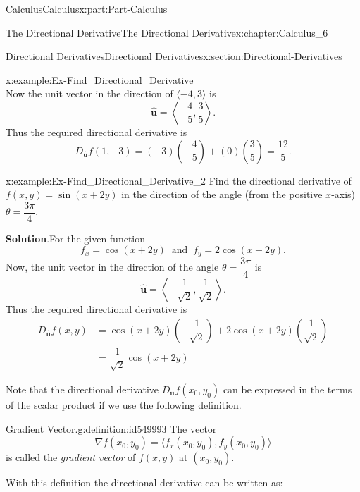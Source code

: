 \documentclass[oneside,10pt,]{book}
\newcommand{\blocktitlefont}{\relax}
\numberwithin{equation}{section}
\newcommand{\bm}[1]{\boldsymbol{#1}}
\newcommand{\amp}{&}
\begin{document}
\begin{partptx}{Calculus}{}{Calculus}{}{}{x:part:Part-Calculus}
\begin{chapterptx}{The Directional Derivative}{}{The Directional Derivative}{}{}{x:chapter:Calculus_6}
\begin{sectionptx}{Directional Derivatives}{}{Directional Derivatives}{}{}{x:section:Directional-Derivatives}
\begin{example}{}{x:example:Ex-Find_Directional_Derivative}
\begin{equation*}
\end{equation*}
Now the unit vector in the direction of \(\langle -4,3 \rangle\) is%
\begin{equation*}
\hat{\bm{u}} = \left \langle -\dfrac{4}{5}, \dfrac{3}{5} \right \rangle\text{.}
\end{equation*}
Thus the required directional derivative is%
\begin{equation*}
D_{\hat{\bm{u}}} f(1,-3) = (-3) \left( -\dfrac{4}{5} \right) + (0) \left( \dfrac{3}{5} \right) = \dfrac{12}{5}\text{.}
\end{equation*}
%
\end{example}
\begin{example}{}{x:example:Ex-Find_Directional_Derivative_2}%
Find the directional derivative of \(f(x,y) = \sin(x+2y)\) in the direction of the angle (from the positive \(x\)-axis) \(\theta = \dfrac{3 \pi}{4}\).%
\par\smallskip%
\noindent\textbf{\blocktitlefont Solution}.\hypertarget{g:solution:id549945}{}\quad{}For the given function%
\begin{equation*}
f_x = \cos(x+2y) \: \text{ and } \: f_y = 2\cos(x+2y)\text{.}
\end{equation*}
Now, the unit vector in the direction of the angle \(\theta = \dfrac{3 \pi}{4}\) is%
\begin{equation*}
\hat{\bm{u}} = \left \langle - \dfrac{1}{\sqrt{2}}, \dfrac{1}{\sqrt{2}} \right \rangle\text{.}
\end{equation*}
Thus the required directional derivative is%
\begin{align*}
D_{\hat{\bm{u}}} f(x,y) \amp = \cos(x+2y) \left( - \dfrac{1}{\sqrt{2}} \right) + 2\cos(x+2y) \left( \dfrac{1}{\sqrt{2}} \right)\\
\amp = \dfrac{1}{\sqrt{2}} \cos(x+2y)
\end{align*}
%
\end{example}
Note that the directional derivative \(D_{\bm{u}} f(x_0,y_0)\) can be expressed in the terms of the scalar product if we use the following definition.%
\begin{definition}{Gradient Vector.}{g:definition:id549993}%
The vector%
\begin{equation*}
\nabla f(x_0,y_0) = \langle f_x(x_0,y_0), f_y(x_0,y_0) \rangle
\end{equation*}
is called the \emph{gradient vector} of \(f(x,y)\) at \((x_0,y_0)\).%
\end{definition}
With this definition the directional derivative can be written as:%
\begin{align*}

\end{align*}
\end{sectionptx}
\end{chapterptx}
\end{partptx}
\end{document}
